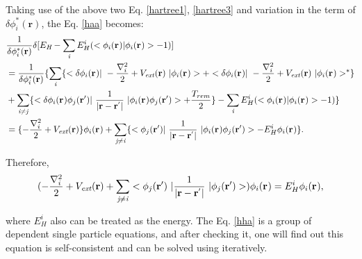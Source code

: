 \documentclass[a4paper, 12pt, titlepage,oneside,drop]{kthesis}
\begin{document}
Taking use of the above two Eq. \ref{hartree1}, \ref{hartree3} and variation in the term of  $\delta \phi^{*}_{i}(\textbf{r}{}) $, the Eq. \ref{haa} becomes:
\begin{equation}
\begin{split}\label{hha}
& \frac{1}{\delta  \phi^{*}_{i}(\textbf{r}{})} \delta [ E_{\textit{H}} - \sumi<i> E^{i}_{H} (<\bwf<i><> | \bwf<i><> > -1)] \\
&  = \frac{1}{\delta  \phi^{*}_{i}(\textbf{r}{})} \{ \sumi<i> \{ < \delta \bwf<i><> |\ -\frac{\nabla^{2}_{i}}{2} + V_\textit{ext}(\textbf{r})  \ | \bwf<i><> > + <  \delta \bwf<i><> |\ -\frac{\nabla^{2}_{i}}{2} + V_\textit{ext}(\textbf{r})  \ |  \bwf<i><> >^{\ast} \} \\
& +  \suminj<i><j> \{  <\delta \bwf<i><> \bwfn<j><'>|\ \frac{1}{|\textbf{r} - \textbf{r}^{'} |} \ | \bwf<i><> \bwfn<j><'>> + \frac{T_{rem}}{2}\} - \sumi<i> E^{i}_{H} (<\bwf<i><> | \bwf<i><> > -1) \} \\
& =  { \{-\frac{\nabla^{2}_{i}}{2} + V_\textit{ext}(\textbf{r})} \}  \bwf<i><> +  \suminj<j><i> \{  <\bwfn<j><'>|\ \frac{1}{|\textbf{r} - \textbf{r}^{'} |} \ | \bwf<i><> \bwfn<j><'>> - E^{i}_{H}  \bwf<i><>  \}.
\end{split}
\end{equation}

Therefore,
\begin{equation}
(-\frac{\nabla^{2}_{i}}{2} + V_\textit{ext}(\textbf{r})+ \suminj<j><i> <\bwfn<j><'>\ | \frac{1}{|\textbf{r} - \textbf{r}^{'} |} \ | \bwfn<j><'>>) \bwf<i><> = E^{i}_{H} \bwf<i><>,
\end{equation}

\noindent where $E^{i}_{H}$  also can be treated as the energy. The Eq. \ref{hha} is a group of dependent single
 particle equations, and after checking it, one will find out this equation is self-consistent and can be solved using iteratively.
\end{document}
